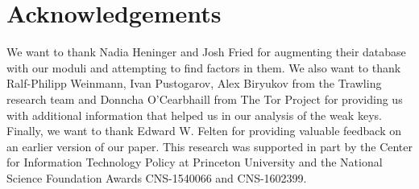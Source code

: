 \section*{Acknowledgements}
We want to thank Nadia Heninger and Josh Fried for augmenting their database
with our moduli and attempting to find factors in them. We also want to
thank Ralf-Philipp Weinmann, Ivan Pustogarov, Alex Biryukov from the Trawling
research team and Donncha O'Cearbhaill from The Tor Project for providing us
with additional information that helped us in our analysis of the weak keys.
Finally, we want to thank Edward W. Felten for providing valuable feedback on an
earlier version of our paper.  This research was supported in part by the Center
for Information Technology Policy at Princeton University and the National
Science Foundation Awards CNS-1540066 and CNS-1602399.
